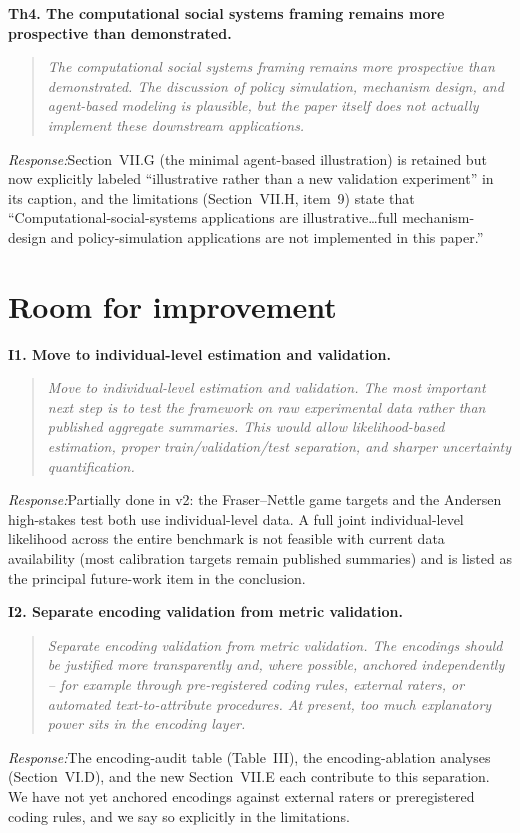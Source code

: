 \documentclass[11pt]{article}
\newcommand{\rev}[1]{\textbf{#1}}
\newcommand{\resp}{\medskip\noindent\emph{Response:}\quad}
\begin{document}
\rev{Th4. The computational social systems framing remains more prospective than demonstrated.}
\begin{quote}\itshape\small
The computational social systems framing remains more prospective than demonstrated. The discussion of policy simulation, mechanism design, and agent-based modeling is plausible, but the paper itself does not actually implement these downstream applications.
\end{quote}
\resp Section~VII.G (the minimal agent-based illustration) is retained but now explicitly
labeled ``illustrative rather than a new validation experiment'' in its caption, and the
limitations (Section~VII.H, item~9) state that ``Computational-social-systems applications
are illustrative\ldots full mechanism-design and policy-simulation applications are not
implemented in this paper.''

\section*{Room for improvement}

\rev{I1. Move to individual-level estimation and validation.}
\begin{quote}\itshape\small
Move to individual-level estimation and validation. The most important next step is to test the framework on raw experimental data rather than published aggregate summaries. This would allow likelihood-based estimation, proper train/validation/test separation, and sharper uncertainty quantification.
\end{quote}
\resp Partially done in v2: the Fraser--Nettle game targets and the Andersen high-stakes
test both use individual-level data. A full joint individual-level likelihood across the
entire benchmark is not feasible with current data availability (most calibration targets
remain published summaries) and is listed as the principal future-work item in the
conclusion.

\rev{I2. Separate encoding validation from metric validation.}
\begin{quote}\itshape\small
Separate encoding validation from metric validation. The encodings should be justified more transparently and, where possible, anchored independently -- for example through pre-registered coding rules, external raters, or automated text-to-attribute procedures. At present, too much explanatory power sits in the encoding layer.
\end{quote}
\resp The encoding-audit table (Table~III), the encoding-ablation analyses (Section~VI.D),
and the new Section~VII.E each contribute to this separation. We have not yet anchored
encodings against external raters or preregistered coding rules, and we say so explicitly
in the limitations.
\end{document}
